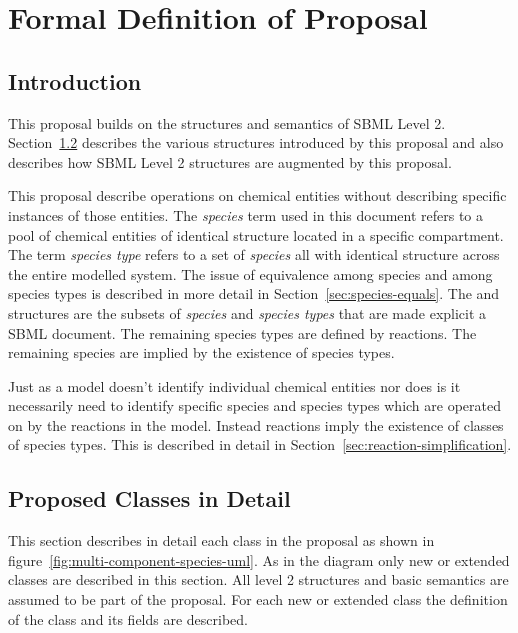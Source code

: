 \documentclass{cekarticle}
\begin{document}
\clearpage


\section{Formal Definition of Proposal}
\label{sec:definitions}

\subsection{Introduction}
\label{sec:defintro}

This proposal builds on the structures and semantics of SBML Level
2.  Section~\ref{sec:class-in-detail} describes the various
structures introduced by this proposal and also describes how SBML
Level 2 structures are augmented by this proposal.

This proposal describe operations on chemical entities without
describing specific instances of those entities.  The
\emph{species} term used in this document refers to a pool of
chemical entities of identical structure located in a specific
compartment.  The term \emph{species type} refers to a set of
\emph{species} all with identical structure across the entire
modelled system.  The issue of equivalence among species and among
species types is described in more detail in
Section~\ref{sec:species-equals}.  The  and
 structures are the subsets of \emph{species}
and \emph{species types} that are made explicit a SBML document.
The remaining species types are defined by reactions.  The
remaining species are implied by the existence of species types.

Just as a model doesn't identify individual chemical entities nor
does is it necessarily need to identify specific species and
species types which are operated on by the reactions in the model.
Instead reactions imply the existence of classes of species types.
This is described in detail in
Section~\ref{sec:reaction-simplification}.

\subsection{Proposed Classes in Detail}
\label{sec:class-in-detail}
This section describes in detail each
class in the proposal as shown in
figure~\ref{fig:multi-component-species-uml}. As in the diagram
only new or extended classes are described in this section. All
level 2 structures and basic semantics are assumed to be part of
the proposal. For each new or extended class the definition of the
class and its fields are described.
\end{document}
